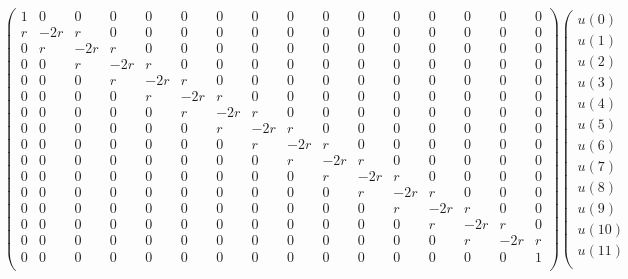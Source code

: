 \documentclass[a4paper,10pt]{article}
\begin{document}
\begin{equation*}
  \left(
  \begin{smallmatrix}
  1 & 0 & 0 & 0 & 0 & 0 & 0 & 0 & 0 & 0 & 0 & 0 & 0 & 0 & 0 & 0 \\
  r & -2r & r & 0 & 0 & 0 & 0 & 0 & 0 & 0 & 0 & 0 & 0 & 0 & 0 & 0 \\
  0 & r & -2r & r & 0 & 0 & 0 & 0 & 0 & 0 & 0 & 0 & 0 & 0 & 0 & 0 \\
  0 & 0 & r & -2r & r & 0 & 0 & 0 & 0 & 0 & 0 & 0 & 0 & 0 & 0 & 0 \\
  0 & 0 & 0 & r & -2r & r & 0 & 0 & 0 & 0 & 0 & 0 & 0 & 0 & 0 & 0 \\
  0 & 0 & 0 & 0 & r & -2r & r & 0 & 0 & 0 & 0 & 0 & 0 & 0 & 0 & 0 \\
  0 & 0 & 0 & 0 & 0 & r & -2r & r & 0 & 0 & 0 & 0 & 0 & 0 & 0 & 0 \\
  0 & 0 & 0 & 0 & 0 & 0 & r & -2r & r & 0 & 0 & 0 & 0 & 0 & 0 & 0 \\
  0 & 0 & 0 & 0 & 0 & 0 & 0 & r & -2r & r & 0 & 0 & 0 & 0 & 0 & 0 \\
  0 & 0 & 0 & 0 & 0 & 0 & 0 & 0 & r & -2r & r & 0 & 0 & 0 & 0 & 0 \\
  0 & 0 & 0 & 0 & 0 & 0 & 0 & 0 & 0 & r & -2r & r & 0 & 0 & 0 & 0 \\
  0 & 0 & 0 & 0 & 0 & 0 & 0 & 0 & 0 & 0 & r & -2r & r & 0 & 0 & 0 \\
  0 & 0 & 0 & 0 & 0 & 0 & 0 & 0 & 0 & 0 & 0 & r & -2r & r & 0 & 0 \\
  0 & 0 & 0 & 0 & 0 & 0 & 0 & 0 & 0 & 0 & 0 & 0 & r & -2r & r & 0 \\
  0 & 0 & 0 & 0 & 0 & 0 & 0 & 0 & 0 & 0 & 0 & 0 & 0 & r & -2r & r \\
  0 & 0 & 0 & 0 & 0 & 0 & 0 & 0 & 0 & 0 & 0 & 0 & 0 & 0 & 0 & 1 \\
  \end{smallmatrix} 
  \right)
  \left(
  \begin{smallmatrix}
  u(0) \\
  u(1) \\
  u(2) \\
  u(3) \\
  u(4) \\
  u(5) \\
  u(6) \\
  u(7) \\
  u(8) \\
  u(9) \\
  u(10) \\
  u(11) \\

\end{smallmatrix}
\end{equation*}
\end{document}
